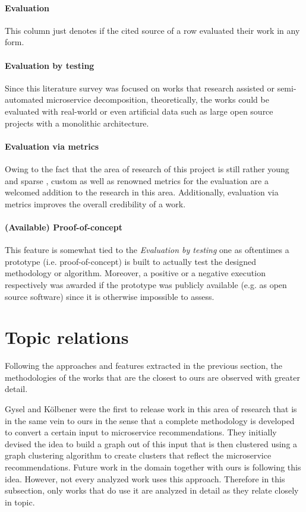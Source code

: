\documentclass[12pt,a4paper]{report}
\begin{document}
\paragraph{Evaluation}
This column just denotes if the cited source of a row evaluated their work in any form.
\paragraph{Evaluation by testing}
Since this literature survey was focused on works that research assisted or semi-automated
microservice decomposition, theoretically, the works could be evaluated with real-world or
even artificial data such as large open source projects with a monolithic architecture.
\paragraph{Evaluation via metrics}
Owing to the fact that the area of research of this project is still rather young and sparse
\cite{jin2018functionality}\cite{fritzsch2018monolith}, custom as well as renowned metrics
for the evaluation are a welcomed addition to the research in this area.
Additionally, evaluation via metrics improves the overall credibility of a work.
\paragraph{(Available) Proof-of-concept}
This feature is somewhat tied to the \textit{Evaluation by testing} one as oftentimes
a prototype (i.e. proof-of-concept) is built to actually test the designed
methodology or algorithm. Moreover, a positive or a negative execution respectively
was awarded if the prototype was publicly available (e.g. as open source software)
since it is otherwise impossible to assess.



\section{Topic relations} \label{subsect:topic-relations}

Following the approaches and features extracted in the previous section,
the methodologies of the works that are the closest to ours are observed with greater detail.

Gysel and K{\"o}lbener \cite{gysel2016service} were the first to release work in
this area of research that is in the same vein to ours in the sense that a
complete methodology is developed to convert a certain input to microservice
recommendations. They initially devised the idea to build a graph out of this
input that is then clustered using a graph clustering algorithm to create clusters
that reflect the microservice recommendations.
Future work in the domain \cite{mazlami2017extraction}\cite{kruidenberg2018monoliths}
together with ours is following this idea.
However, not every analyzed work uses this approach.
Therefore in this subsection, only works that do use it are analyzed in detail
as they relate closely in topic.
\end{document}
